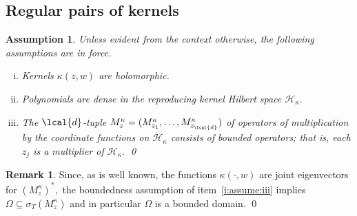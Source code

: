 \documentclass[a4paper,reqno,index]{amsart}
\newcommand{\df}[1]{{\textit{#1}}{\index{#1}}}
\numberwithin{equation}{section}
\newtheorem{assumption}[theorem]{Assumption}
\newcommand{\cH}{\mathcal{H}}
\newcommand{\specT}{\sigma_T}  %
\newcommand{\genk}{\kappa} %
\theoremstyle{definition}
\newtheorem{remark}[theorem]{Remark}
\begin{document}
\subsection{Regular pairs of kernels}
\label{sss:regular}

\begin{assumption}\rm
 \label{assume}
Unless evident from the context otherwise, the following assumptions are in force.
\begin{enumerate}[(i)]\itemsep=6pt
 \item  %
 Kernels $\genk(z,w)$  are holomorphic.
       

 \item \label{i:assume:ii}
     Polynomials are dense in the reproducing kernel Hilbert space $\mathcal{H}_\genk.$ 
 
  \item \label{i:assume:iii}
  The $\lcal{d}$-tuple \df{$M^\genk_z=(M^\genk_{z_1}, \dots, M^\genk_{z_\lcal{d}})$} of operators of multiplication by the coordinate functions on $\cH_\genk$ consists of bounded operators; that is, each $z_j$ is  a multiplier
  of $\cH_\genk.$  \qed
\end{enumerate}
\end{assumption}

\begin{remark}
  \label{r:assume-Omega-bounded}
    Since, as is well known, the functions $\genk(\cdot,w)$ are joint
    eigenvectors for $(M_z^\genk)^*,$ the boundedness assumption of
    item~\ref{i:assume:iii} implies $\Omega\subseteq \specT(M_z^\genk)$  and in particular $\Omega$ is a bounded domain.
    \qed
\end{remark}

 
\end{document}
